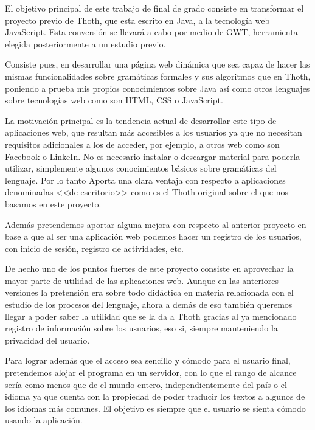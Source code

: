 
El objetivo principal de este trabajo de final de grado consiste en transformar el proyecto previo de Thoth, que esta escrito en Java, a la tecnología web JavaScript. Esta conversión se llevará a cabo por medio de GWT, herramienta elegida posteriormente a un estudio previo. 

Consiste pues, en desarrollar una página web dinámica que sea capaz de hacer las mismas funcionalidades sobre gramáticas formales y sus algoritmos que en Thoth, poniendo a prueba mis propios conocimientos sobre Java así como otros lenguajes sobre tecnologías web como son HTML, CSS o JavaScript.

La motivación principal es la tendencia actual de desarrollar este tipo de aplicaciones web, que resultan más accesibles a los usuarios ya que no necesitan requisitos adicionales a los de acceder, por ejemplo, a otros web como son Facebook o LinkeIn. No es necesario instalar o descargar material para poderla utilizar, simplemente algunos conocimientos básicos sobre gramáticas del lenguaje. Por lo tanto Aporta una clara ventaja con respecto a aplicaciones denominadas <<de escritorio>> como es el Thoth original sobre el que nos basamos en este proyecto.

Además pretendemos aportar alguna mejora con respecto al anterior proyecto en base a que al ser una aplicación web podemos hacer un registro de los usuarios, con inicio de sesión, registro de actividades, etc. 

De hecho uno de los puntos fuertes de este proyecto consiste en aprovechar la mayor parte de utilidad de las aplicaciones web. Aunque en las anteriores versiones la pretensión era sobre todo didáctica en materia relacionada con el estudio de los procesos del lenguaje, ahora a demás de eso también queremos llegar a poder saber la utilidad que se la da a Thoth gracias al ya mencionado registro de información sobre los usuarios, eso si, siempre manteniendo la privacidad del usuario. 

Para lograr además que el acceso sea sencillo y cómodo para el usuario final, pretendemos alojar el programa en un servidor, con lo que el rango de alcance sería como menos que de el mundo entero, independientemente del país o el idioma ya que cuenta con la propiedad de poder traducir los textos a algunos de los idiomas más comunes. El objetivo es siempre que el usuario se sienta cómodo usando la aplicación.
